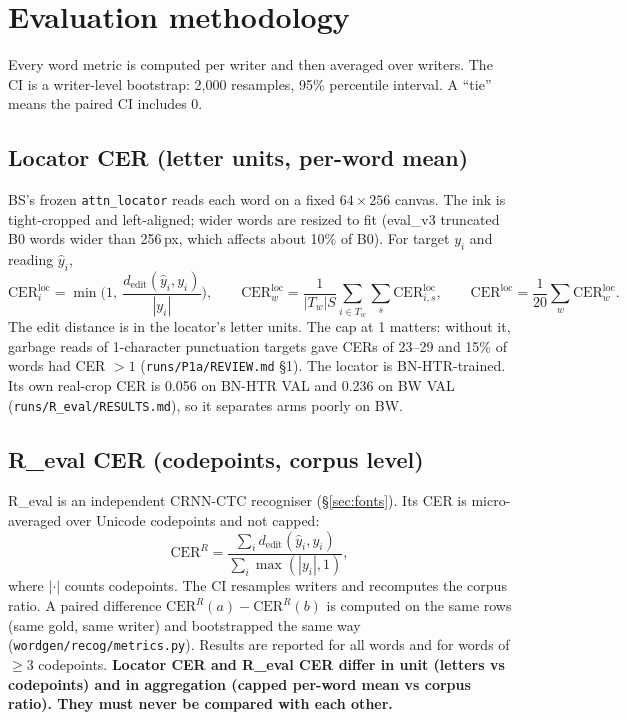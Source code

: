 \documentclass[10.5pt,a4paper]{article}
\newcommand{\fp}[1]{\nolinkurl{#1}}
\begin{document}
\section{Evaluation methodology}
\label{sec:eval}

Every word metric is computed per writer and then averaged over writers. The CI is a writer-level bootstrap: 2,000
resamples, 95\% percentile interval. A ``tie'' means the paired CI includes 0.

\subsection{Locator CER (letter units, per-word mean)}
BS's frozen \texttt{attn\_locator} reads each word on a fixed $64\times256$ canvas. The ink is tight-cropped and
left-aligned; wider words are resized to fit (eval\_v3 truncated B0 words wider than 256\,px, which affects about 10\% of
B0). For target $y_i$ and reading $\hat y_i$,
\begin{equation}
\mathrm{CER}^{\mathrm{loc}}_i=\min\!\Big(1,\ \frac{d_{\mathrm{edit}}(\hat y_i,y_i)}{|y_i|}\Big),\qquad
\mathrm{CER}^{\mathrm{loc}}_w=\frac{1}{|T_w|S}\sum_{i\in T_w}\sum_{s}\mathrm{CER}^{\mathrm{loc}}_{i,s},\qquad
\mathrm{CER}^{\mathrm{loc}}=\frac{1}{20}\sum_w \mathrm{CER}^{\mathrm{loc}}_w .
\end{equation}
The edit distance is in the locator's letter units. The cap at 1 matters: without it, garbage reads of 1-character
punctuation targets gave CERs of 23--29 and 15\% of words had CER $>1$ (\fp{runs/P1a/REVIEW.md} \S1). The locator is
BN-HTR-trained. Its own real-crop CER is 0.056 on BN-HTR VAL and 0.236 on BW VAL (\fp{runs/R_eval/RESULTS.md}), so it
separates arms poorly on BW.

\subsection{R\_eval CER (codepoints, corpus level)}
R\_eval is an independent CRNN-CTC recogniser (\S\ref{sec:fonts}). Its CER is micro-averaged over Unicode codepoints and
not capped:
\begin{equation}
\mathrm{CER}^{R}=\frac{\sum_i d_{\mathrm{edit}}(\hat y_i,y_i)}{\sum_i \max(|y_i|,1)} ,
\end{equation}
where $|\cdot|$ counts codepoints. The CI resamples writers and recomputes the corpus ratio. A paired difference
$\mathrm{CER}^R(a)-\mathrm{CER}^R(b)$ is computed on the same rows (same gold, same writer) and bootstrapped the same way
(\fp{wordgen/recog/metrics.py}). Results are reported for all words and for words of $\ge$3 codepoints. \textbf{Locator CER
and R\_eval CER differ in unit (letters vs codepoints) and in aggregation (capped per-word mean vs corpus ratio). They must
never be compared with each other.}
\end{document}
